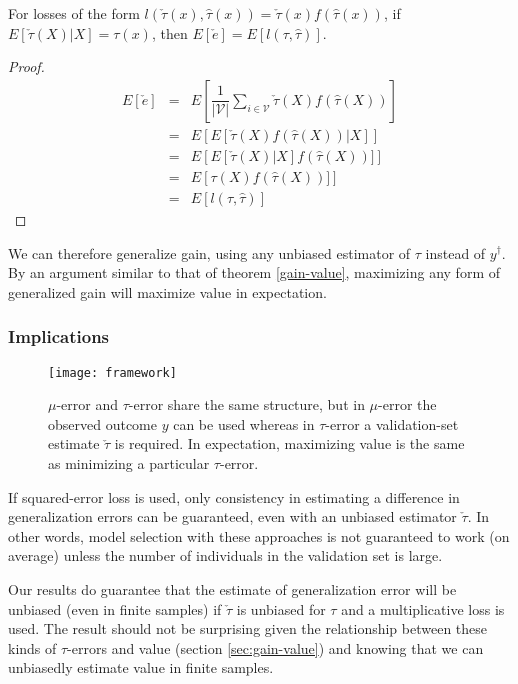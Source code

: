 \begin{theorem}
For losses of the form $l(\check\tau(x), \hat\tau(x)) = \check\tau(x) f(\hat\tau(x))$, if $E[\check\tau(X)|X] = \tau(x)$, then $E[\check e] = E [  l(\tau, \hat\tau) ]$.
\end{theorem}

\begin{proof}

\[
\begin{array}{rcl}
	E[\check e] & = & E \left[ \dfrac{1}{| \mathcal V |} \sum_{i \in \mathcal V} \check\tau(X) f(\hat\tau(X)) \right] \\
	& = & E \left[  E[ \check\tau(X) f(\hat\tau(X)) | X] \right] \\
	& = & E \left[  E[ \check\tau(X)|X] f(\hat\tau(X))] \right] \\
	& = & E \left[  \tau(X) f(\hat\tau(X))] \right] \\
	& = & E [  l(\tau, \hat\tau) ]
\end{array}
\]

\end{proof}

We can therefore generalize gain, using any unbiased estimator of $\tau$ instead of $y^{\dagger}$. By an argument similar to that of theorem \ref{gain-value}, maximizing any form of generalized gain will maximize value in expectation.

\subsubsection{Implications}

\begin{figure}
\centering
\texttt{[image: framework]}
\caption{$\mu$-error and $\tau$-error share the same structure, but in $\mu$-error the observed outcome $y$ can be used whereas in $\tau$-error a validation-set estimate $\check\tau$ is required. In expectation, maximizing value is the same as minimizing a particular $\tau$-error.}
\end{figure}

If squared-error loss is used, only consistency in estimating a difference in generalization errors can be guaranteed, even with an unbiased estimator $\check\tau$. In other words, model selection with these approaches is not guaranteed to work (on average) unless the number of individuals in the validation set is large.

Our results do guarantee that the estimate of generalization error will be unbiased (even in finite samples) if $\check\tau$ is unbiased for $\tau$ and a multiplicative loss is used. The result should not be surprising given the relationship between these kinds of $\tau$-errors and value (section \ref{sec:gain-value}) and knowing that we can unbiasedly estimate value in finite samples. 

